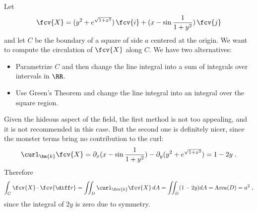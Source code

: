 \begin{frame}
\begin{example}

Let
\[
\fcv{X} = (y^2+e^{\sqrt{1+x^2}}) \, \fcv{i} + (x-\sin{\frac{1}{1+y^2}})\, \fcv{j}
\]
%
and let $C$ be the boundary of a square of side $a$ centered at the origin. We want to compute the circulation of $\fcv{X}$ along $C$. We have two alternatives:

\begin{itemize}
  \item Parametrize $C$ and then change the line integral into a sum of integrals over intervals in $\RR$.
  \item Use Green's Theorem and change the line integral into an integral over the square region.
\end{itemize}

Given the hideous aspect of the field, the first method is not too appealing, and it is not recommended in this case. But the second one is definitely nicer, since the monster terms bring no contribution to the curl:
%
$$\curl_{\bm{k}} \fcv{X} = \partial_x (x-\sin{\frac{1}{1+y^2}}) - \partial_y (y^2+e^{\sqrt{1+x^2}}) = 1-2y \; .$$
%
Therefore
%
$$\int_C \fcv{X} \cdot \fcv{\diff r} = \int\!\!\!\int_D \curl_{\fcv{k}} \fcv{X} \, dA = \int\!\!\!\int_D (1-2y) dA = \text{Area}(D) = a^2\; ,$$
%
since the integral of $2y$ is zero due to symmetry.
\end{example}
\end{frame}